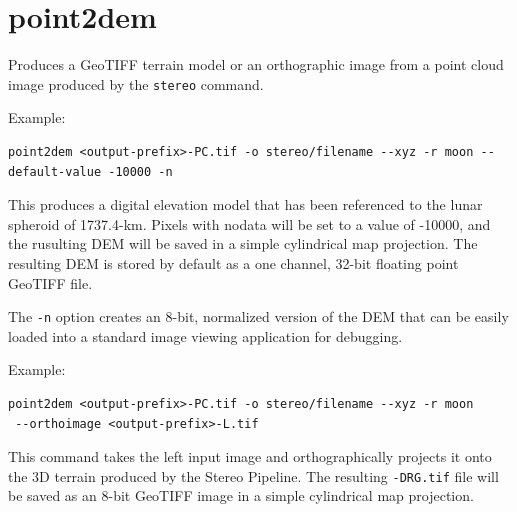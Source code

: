 
\section{point2dem}
\label{point2dem}

Produces a GeoTIFF terrain model or an orthographic image from a point cloud image produced by the {\tt stereo} command.

Example:
\begin{verbatim}
point2dem <output-prefix>-PC.tif -o stereo/filename --xyz -r moon --default-value -10000 -n
\end{verbatim}

This produces a digital elevation model that has been referenced to
the lunar spheroid of 1737.4-km.  Pixels with nodata will be set to a
value of -10000, and the rusulting DEM will be saved in a simple
cylindrical map projection.  The resulting DEM is stored by default as
a one channel, 32-bit floating point GeoTIFF file.

The {\tt -n} option creates an 8-bit, normalized version of the DEM
that can be easily loaded into a standard image viewing application
for debugging.

Example:
\begin{verbatim}
point2dem <output-prefix>-PC.tif -o stereo/filename --xyz -r moon
 --orthoimage <output-prefix>-L.tif
\end{verbatim}

This command takes the left input image and orthographically projects
it onto the 3D terrain produced by the Stereo Pipeline.  The resulting
{\tt *-DRG.tif} file will be saved as an 8-bit GeoTIFF image in a
simple cylindrical map projection.

